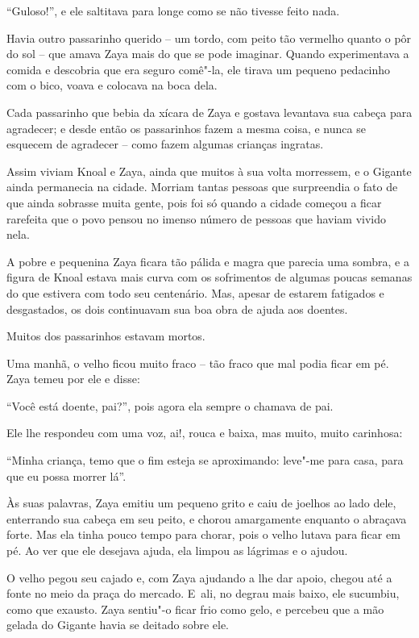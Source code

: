 ``Guloso!'', e ele saltitava para longe como se não tivesse feito nada.

Havia outro passarinho querido -- um tordo, com peito tão vermelho
quanto o pôr do sol -- que amava Zaya mais do que se pode imaginar.
Quando experimentava a comida e descobria que era seguro comê"-la, ele
tirava um pequeno pedacinho com o bico, voava e colocava na boca dela.

Cada passarinho que bebia da xícara de Zaya e gostava levantava sua
cabeça para agradecer; e desde então os passarinhos fazem a mesma coisa,
e nunca se esquecem de agradecer -- como fazem algumas crianças
ingratas.

Assim viviam Knoal e Zaya, ainda que muitos à sua volta morressem, e o
Gigante ainda permanecia na cidade. Morriam tantas pessoas que
surpreendia o fato de que ainda sobrasse muita gente, pois foi só quando
a cidade começou a ficar rarefeita que o povo pensou no imenso número de
pessoas que haviam vivido nela.

A pobre e pequenina Zaya ficara tão pálida e magra que parecia uma
sombra, e a figura de Knoal estava mais curva com os sofrimentos de
algumas poucas semanas do que estivera com todo seu centenário. Mas,
apesar de estarem fatigados e desgastados, os dois continuavam sua boa
obra de ajuda aos doentes.

Muitos dos passarinhos estavam mortos.

Uma manhã, o velho ficou muito fraco -- tão fraco que mal podia ficar em
pé. Zaya temeu por ele e disse:

``Você está doente, pai?'', pois agora ela sempre o chamava de pai.

Ele lhe respondeu com uma voz, ai!, rouca e baixa, mas muito, muito
carinhosa:

``Minha criança, temo que o fim esteja se aproximando: leve"-me para
casa, para que eu possa morrer lá''.

Às suas palavras, Zaya emitiu um pequeno grito e caiu de joelhos ao lado
dele, enterrando sua cabeça em seu peito, e chorou amargamente enquanto
o abraçava forte. Mas ela tinha pouco tempo para chorar, pois o velho
lutava para ficar em pé. Ao ver que ele desejava ajuda, ela limpou as
lágrimas e o ajudou.

O velho pegou seu cajado e, com Zaya ajudando a lhe dar apoio, chegou
até a fonte no meio da praça do mercado. E~ali, no degrau mais baixo,
ele sucumbiu, como que exausto. Zaya sentiu"-o ficar frio como gelo, e
percebeu que a mão gelada do Gigante havia se deitado sobre ele.

